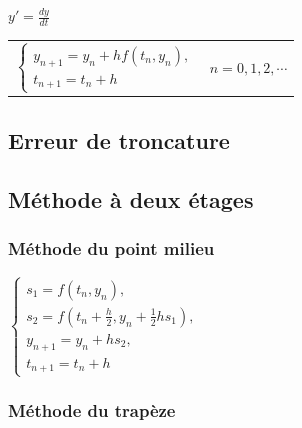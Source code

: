 \documentclass[a4paper,9pt]{extarticle}
\begin{document}
\begin{multicols*}{2}
$y'=\frac{dy}{dt}$

\begin{tabular}{ll}
$
\begin{cases}
y_{n+1} = y_n + hf(t_n,y_n), \\
t_{n+1} = t_n + h
\end{cases}
$
&
$n=0,1,2,\cdots$
\end{tabular}
\subsection{Erreur de troncature}
\subsection{Méthode à deux étages}
\subsubsection{Méthode du point milieu}
$
\begin{cases}
s_1 = f(t_n,y_n),\\
s_2 = f \left(t_n + \frac{h}{2}, y_n + \frac{1}{2}hs_1 \right),\\
y_{n+1} = y_n + hs_2, \\
t_{n+1} = t_n + h
\end{cases}
$
\subsubsection{Méthode du trapèze}


\end{multicols*}
\end{document}
